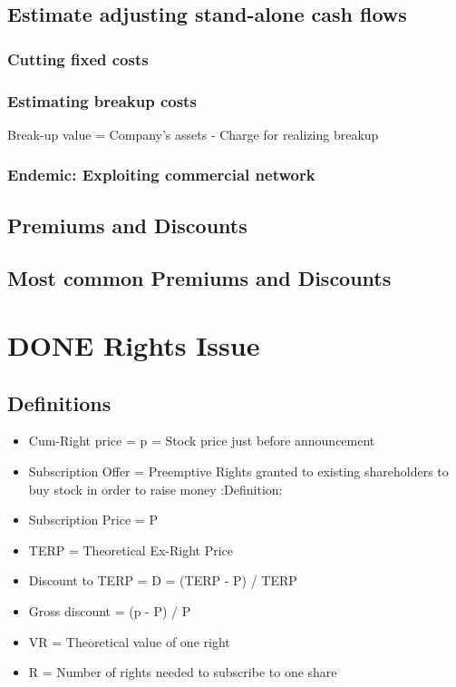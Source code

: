 \documentclass[11pt]{article}
\begin{document}
\subsection*{Estimate adjusting stand-alone cash flows}
\label{sec:orgda60150}
\subsubsection*{Cutting fixed costs}
\label{sec:orgf1f81e7}
\subsubsection*{Estimating breakup costs}
\label{sec:orgec66be7}
Break-up value = Company's assets - Charge for realizing breakup\\
\subsubsection*{Endemic: Exploiting commercial network}
\label{sec:org7eb40dd}
\subsection*{Premiums and Discounts}
\label{sec:orgc300400}
\subsection*{Most common Premiums and Discounts}
\label{sec:org87a8a75}

\section*{{\bfseries\sffamily DONE} Rights Issue}
\label{sec:org9bbd651}
\subsection*{Definitions}
\label{sec:org8eab72b}
\begin{itemize}
\item Cum-Right price = p = Stock price just before announcement\\
\item Subscription Offer = Preemptive Rights granted to existing shareholders to buy stock  in order to raise  money :Definition:\\
\item Subscription Price = P\\
\item TERP = Theoretical Ex-Right Price\\
\item Discount to TERP = D = (TERP - P) / TERP\\
\item Gross discount = (p - P) / P\\
\item VR = Theoretical value of one right\\
\item R = Number of rights needed to subscribe to one share\\
\end{itemize}
\end{document}
